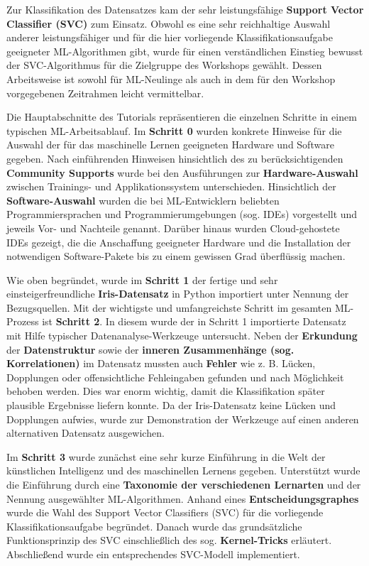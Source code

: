 \documentclass [oneside,10pt,a4paper,ngerman,BCOR10mm,headsepline,parindent,final]{scrartcl}
\begin{document}
Zur Klassifikation des Datensatzes kam der sehr leistungsfähige
\textbf{Support Vector Classifier (SVC)} zum Einsatz. Obwohl es eine
sehr reichhaltige Auswahl anderer leistungsfähiger und für die hier
vorliegende Klassifikationsaufgabe geeigneter ML-Algorithmen gibt, wurde
für einen verständlichen Einstieg bewusst der SVC-Algorithmus für die
Zielgruppe des Workshops gewählt. Dessen Arbeitsweise ist sowohl für
ML-Neulinge als auch in dem für den Workshop vorgegebenen Zeitrahmen
leicht vermittelbar.

Die Hauptabschnitte des Tutorials repräsentieren die einzelnen Schritte
in einem typischen ML-Arbeitsablauf. Im \textbf{Schritt 0} wurden
konkrete Hinweise für die Auswahl der für das maschinelle Lernen
geeigneten Hardware und Software gegeben. Nach einführenden Hinweisen
hinsichtlich des zu berücksichtigenden \textbf{Community Supports} wurde
bei den Ausführungen zur \textbf{Hardware-Auswahl} zwischen Trainings-
und Applikationssystem unterschieden. Hinsichtlich der
\textbf{Software-Auswahl} wurden die bei ML-Entwicklern beliebten
Programmiersprachen und Programmierumgebungen (sog. IDEs) vorgestellt
und jeweils Vor- und Nachteile genannt. Darüber hinaus wurden
Cloud-gehostete IDEs gezeigt, die die Anschaffung geeigneter Hardware
und die Installation der notwendigen Software-Pakete bis zu einem
gewissen Grad überflüssig machen.

Wie oben begründet, wurde im \textbf{Schritt 1} der fertige und sehr
einsteigerfreundliche \textbf{Iris-Datensatz} in Python importiert unter
Nennung der Bezugsquellen. Mit der wichtigste und umfangreichste Schritt
im gesamten ML-Prozess ist \textbf{Schritt 2}. In diesem wurde der in
Schritt 1 importierte Datensatz mit Hilfe typischer
Datenanalyse-Werkzeuge untersucht. Neben der \textbf{Erkundung} der
\textbf{Datenstruktur} sowie der \textbf{inneren Zusammenhänge (sog.
Korrelationen)} im Datensatz mussten auch \textbf{Fehler} wie z. B.
Lücken, Dopplungen oder offensichtliche Fehleingaben gefunden und nach
Möglichkeit behoben werden. Dies war enorm wichtig, damit die
Klassifikation später plausible Ergebnisse liefern konnte. Da der
Iris-Datensatz keine Lücken und Dopplungen aufwies, wurde zur
Demonstration der Werkzeuge auf einen anderen alternativen Datensatz
ausgewichen.

Im \textbf{Schritt 3} wurde zunächst eine sehr kurze Einführung in die
Welt der künstlichen Intelligenz und des maschinellen Lernens gegeben.
Unterstützt wurde die Einführung durch eine \textbf{Taxonomie der
verschiedenen Lernarten} und der Nennung ausgewählter ML-Algorithmen.
Anhand eines \textbf{Entscheidungsgraphes} wurde die Wahl des Support
Vector Classifiers (SVC) für die vorliegende Klassifikationsaufgabe
begründet. Danach wurde das grundsätzliche Funktionsprinzip des SVC
einschließlich des sog. \textbf{Kernel-Tricks} erläutert. Abschließend
wurde ein entsprechendes SVC-Modell implementiert.
\end{document}
